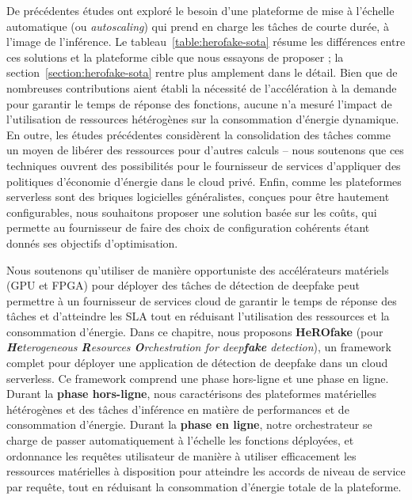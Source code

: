 De précédentes études ont exploré le besoin d'une plateforme de mise à l'échelle automatique (ou \textit{autoscaling}) qui prend en charge les tâches de courte durée, à l'image de l'inférence. Le tableau~\ref{table:herofake-sota} résume les différences entre ces solutions et la plateforme cible que nous essayons de proposer ; la section~\ref{section:herofake-sota} rentre plus amplement dans le détail. Bien que de nombreuses contributions aient établi la nécessité de l'accélération à la demande pour garantir le temps de réponse des fonctions, aucune n'a mesuré l'impact de l'utilisation de ressources hétérogènes sur la consommation d'énergie dynamique. En outre, les études précédentes considèrent la consolidation des tâches comme un moyen de libérer des ressources pour d'autres calculs -- nous soutenons que ces techniques ouvrent des possibilités pour le fournisseur de services d'appliquer des politiques d'économie d'énergie dans le cloud privé. Enfin, comme les plateformes serverless sont des briques logicielles généralistes, conçues pour être hautement configurables, nous souhaitons proposer une solution basée sur les coûts, qui permette au fournisseur de faire des choix de configuration cohérents étant donnés ses objectifs d'optimisation.

Nous soutenons qu'utiliser de manière opportuniste des accélérateurs matériels (GPU et FPGA) pour déployer des tâches de détection de deepfake peut permettre à un fournisseur de services cloud de garantir le temps de réponse des tâches et d'atteindre les SLA tout en réduisant l'utilisation des ressources et la consommation d'énergie. Dans ce chapitre, nous proposons \textbf{HeROfake} (pour \textit{\textbf{He}terogeneous \textbf{R}esources \textbf{O}rchestration for deep\textbf{fake} detection}), un framework complet pour déployer une application de détection de deepfake dans un cloud serverless. Ce framework comprend une phase hors-ligne et une phase en ligne. Durant la \textbf{phase hors-ligne}, nous caractérisons des plateformes matérielles hétérogènes et des tâches d'inférence en matière de performances et de consommation d'énergie. Durant la \textbf{phase en ligne}, notre orchestrateur se charge de passer automatiquement à l'échelle les fonctions déployées, et ordonnance les requêtes utilisateur de manière à utiliser efficacement les ressources matérielles à disposition pour atteindre les accords de niveau de service par requête, tout en réduisant la consommation d'énergie totale de la plateforme.

